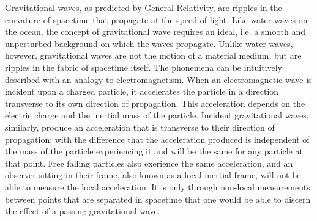 \newcommand{\FILL}{\textcolor{red}{FILLME}}



Gravitational waves, as predicted by General Relativity, are ripples in the
curvature of spacetime that propagate at the speed of light. 
Like water waves on the ocean, the concept of gravitational wave requires an
ideal, i.e. a smooth and unperturbed background on which the waves 
propagate. Unlike water waves, however, gravitational waves are not the motion 
of a material medium, but are ripples in the fabric of spacetime itself.
The phonemena can be intuitively described with an analogy to electromagnetism. 
When an electromagnetic wave is incident upon a charged particle, it 
accelerates the particle in a direction transverse to its own direction
of propagation. This acceleration depends on the electric charge 
and the inertial mass of the particle.
Incident gravitational waves, similarly, produce an acceleration that is 
transverse to their direction of propagation; with the difference that the 
acceleration produced is independent of the mass of the particle experiencing
it and will be the same for any particle at that point. 
Free falling particles also exerience the same acceleration, and an observer
sitting in their frame, also known as a local inertial frame,
will not be able to measure the local acceleration. 
It is only through non-local measurements between points that are separated 
in spacetime that one would be able to discern the effect of a passing 
gravitational wave.



